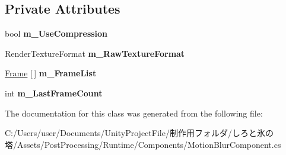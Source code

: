 \subsection*{Private Attributes}
\begin{DoxyCompactItemize}
\item 
\mbox{\label{class_unity_engine_1_1_post_processing_1_1_motion_blur_component_1_1_frame_blending_filter_a7fece09db52e92364b1a3bbcffa3959c}} 
bool {\bfseries m\+\_\+\+Use\+Compression}
\item 
\mbox{\label{class_unity_engine_1_1_post_processing_1_1_motion_blur_component_1_1_frame_blending_filter_af557ed441fdde8231c03cdf30d77f9ae}} 
Render\+Texture\+Format {\bfseries m\+\_\+\+Raw\+Texture\+Format}
\item 
\mbox{\label{class_unity_engine_1_1_post_processing_1_1_motion_blur_component_1_1_frame_blending_filter_aad11ce62c381c329f42426310f5ec6d1}} 
\hyperlink{struct_unity_engine_1_1_post_processing_1_1_motion_blur_component_1_1_frame_blending_filter_1_1_frame}{Frame} \mbox{[}$\,$\mbox{]} {\bfseries m\+\_\+\+Frame\+List}
\item 
\mbox{\label{class_unity_engine_1_1_post_processing_1_1_motion_blur_component_1_1_frame_blending_filter_a2a6562c51e2f6080dd716292c6f3c0ca}} 
int {\bfseries m\+\_\+\+Last\+Frame\+Count}
\end{DoxyCompactItemize}


The documentation for this class was generated from the following file\+:\begin{DoxyCompactItemize}
\item 
C\+:/\+Users/user/\+Documents/\+Unity\+Project\+File/制作用フォルダ/しろと氷の塔/\+Assets/\+Post\+Processing/\+Runtime/\+Components/Motion\+Blur\+Component.\+cs\end{DoxyCompactItemize}

